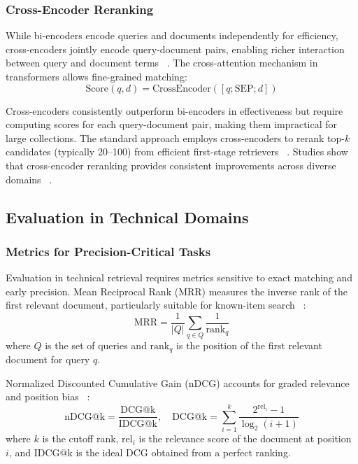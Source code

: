 \documentclass[preprint,12pt]{elsarticle}
\begin{document}
\subsubsection{Cross-Encoder Reranking}

While bi-encoders encode queries and documents independently for efficiency, cross-encoders jointly encode query-document pairs, enabling richer interaction between query and document terms ~\cite{nogueira2020passage}. The cross-attention mechanism in transformers allows fine-grained matching:
\begin{equation}
\text{Score}(q,d) = \text{CrossEncoder}([q; \text{SEP}; d])
\end{equation}

Cross-encoders consistently outperform bi-encoders in effectiveness but require computing scores for each query-document pair, making them impractical for large collections. The standard approach employs cross-encoders to rerank top-$k$ candidates (typically 20--100) from efficient first-stage retrievers ~\cite{nogueira2020passage}. Studies show that cross-encoder reranking provides consistent improvements across diverse domains ~\cite{zhuang2023rankt5}.

\subsection{Evaluation in Technical Domains}

\subsubsection{Metrics for Precision-Critical Tasks}

Evaluation in technical retrieval requires metrics sensitive to exact matching and early precision. Mean Reciprocal Rank (MRR) measures the inverse rank of the first relevant document, particularly suitable for known-item search ~\cite{craswell2009mean}:
\begin{equation}
\text{MRR} = \frac{1}{|Q|} \sum_{q \in Q} \frac{1}{\text{rank}_q}
\end{equation}
where $Q$ is the set of queries and $\text{rank}_q$ is the position of the first relevant document for query $q$.

Normalized Discounted Cumulative Gain (nDCG) accounts for graded relevance and position bias ~\cite{jarvelin2002cumulated}:
\begin{equation}
\text{nDCG@k} = \frac{\text{DCG@k}}{\text{IDCG@k}}, \quad \text{DCG@k} = \sum_{i=1}^k \frac{2^{\text{rel}_i} - 1}{\log_2(i+1)}
\end{equation}
where $k$ is the cutoff rank, $\text{rel}_i$ is the relevance score of the document at position $i$, and $\text{IDCG@k}$ is the ideal DCG obtained from a perfect ranking.
\end{document}
